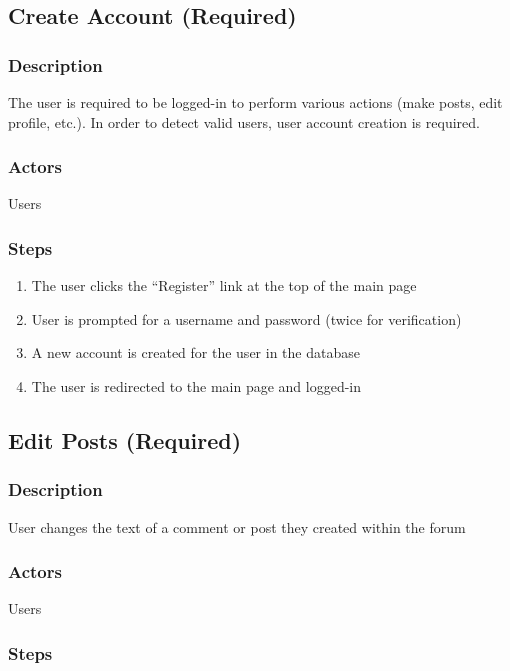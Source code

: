 \documentclass[12pt]{scrartcl}
\begin{document}
\subsection{Create Account (Required)}
\subsubsection{Description}

The user is required to be logged-in to perform various actions (make posts, edit profile, etc.).
In order to detect valid users, user account creation is required. 

\subsubsection{Actors}

Users

\subsubsection{Steps}

\begin{enumerate}
\item The user clicks the ``Register'' link at the top of the main page
\item User is prompted for a username and password (twice for verification)
\item A new account is created for the user in the database
\item The user is redirected to the main page and logged-in
\end{enumerate}

\subsection{Edit Posts (Required)}
\subsubsection{Description}

User changes the text of a comment or post they created within the forum

\subsubsection{Actors}

Users

\subsubsection{Steps}
\end{document}
